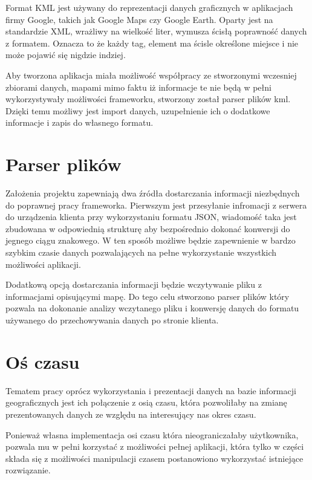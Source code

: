 Format KML jest używany do reprezentacji danych graficznych w aplikacjach firmy Google, takich jak Google Maps czy Google Earth. Oparty jest na standardzie XML, wrażliwy na wielkość liter, wymusza ścisłą poprawność danych z formatem. Oznacza to że każdy tag, element ma ścisle określone miejsce i nie może pojawić się nigdzie indziej.

Aby tworzona aplikacja miała możliwość współpracy ze stworzonymi wczesniej zbiorami danych, mapami mimo faktu iż informacje te nie będą w pełni wykorzystywały możliwości frameworku, stworzony został parser plików kml. Dzięki temu możliwy jest import danych, uzupełnienie ich o dodatkowe informacje i zapis do własnego formatu.

\section{Parser plików}
\label{sec:parser}

Założenia projektu zapewniają dwa źródła dostarczania informacji niezbędnych do poprawnej pracy frameworka.
Pierwszym jest przesyłanie infromacji z serwera do urządzenia klienta przy wykorzystaniu formatu JSON, wiadomość taka jest zbudowana w odpowiednią strukturę aby bezpośrednio dokonać konwersji do jegnego ciągu znakowego. W ten sposób możliwe będzie zapewnienie w bardzo szybkim czasie danych pozwalających na pełne wykorzystanie wszystkich możliwości aplikacji.

Dodatkową opcją dostarczania informacji będzie wczytywanie pliku z informacjami opisującymi mapę. Do tego celu stworzono parser plików który pozwala na dokonanie analizy wczytanego pliku i konwersję danych do formatu używanego do przechowywania danych po stronie klienta.

\section{Oś czasu}
\label{sec:timeLine}

Tematem pracy oprócz wykorzystania i prezentacji danych na bazie informacji geograficznych jest ich połączenie z osią czasu, która pozwoliłaby na zmianę prezentowanych danych ze względu na interesujący nas okres czasu.

Ponieważ własna implementacja osi czasu która nieograniczałaby użytkownika, pozwala mu w pełni korzystać z możliwości pełnej aplikacji, która tylko w części składa się z możliwości manipulacji czasem postanowiono wykorzystać istniejące rozwiązanie.

